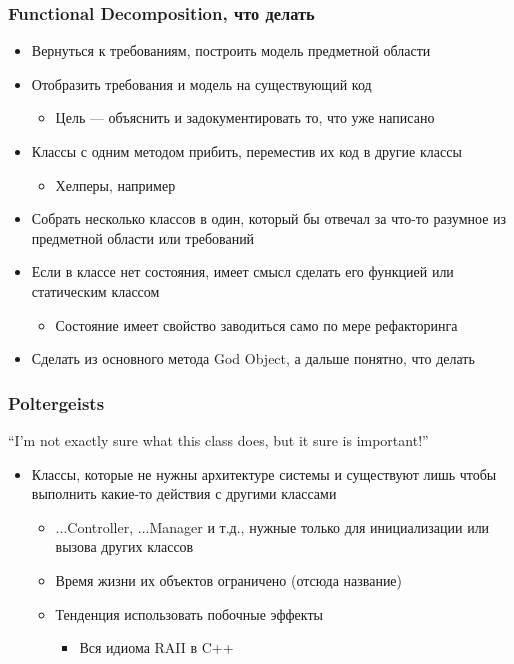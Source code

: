\documentclass[xetex,mathserif,serif]{beamer}
\begin{document}
	\begin{frame}
		\frametitle{Functional Decomposition, что делать}
		\begin{itemize}
			\item Вернуться к требованиям, построить модель предметной области
			\item Отобразить требования и модель на существующий код
			\begin{itemize}
				\item Цель --- объяснить и задокументировать то, что уже написано
			\end{itemize}
			\item Классы с одним методом прибить, переместив их код в другие классы
			\begin{itemize}
				\item Хелперы, например
			\end{itemize}
			\item Собрать несколько классов в один, который бы отвечал за что-то разумное из предметной области или требований
			\item Если в классе нет состояния, имеет смысл сделать его функцией или статическим классом
			\begin{itemize}
				\item Состояние имеет свойство заводиться само по мере рефакторинга
			\end{itemize}
			\item Сделать из основного метода God Object, а дальше понятно, что делать
		\end{itemize}
	\end{frame}

	\begin{frame}
		\frametitle{Poltergeists}
		``I’m not exactly sure what this class does, but it sure is important!''
		\begin{itemize}
			\item Классы, которые не нужны архитектуре системы и существуют лишь чтобы выполнить какие-то действия с другими классами
			\begin{itemize}
				\item ...Controller, ...Manager и т.д., нужные только для инициализации или вызова других классов
				\item Время жизни их объектов ограничено (отсюда название)
				\item Тенденция использовать побочные эффекты
				\begin{itemize}
					\item Вся идиома RAII в C++
				\end{itemize}
			\end{itemize}
		\end{itemize}
	\end{frame}
\end{document}
